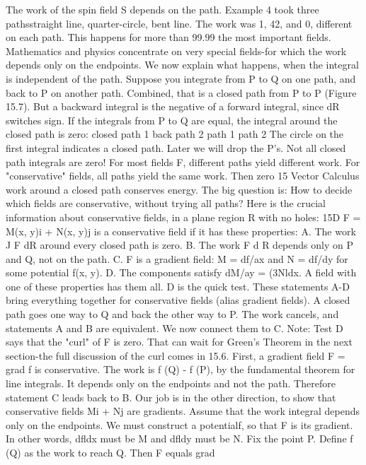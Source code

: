 The work of the spin field S depends on the path. Example 4 took three pathsstraight
line, quarter-circle, bent line. The work was 1, 42, and 0, different on each
path. This happens for more than 99.99%
the most important fields. Mathematics and physics concentrate on very special
fields-for which the work depends only on the endpoints. We now explain what
happens, when the integral is independent of the path.
Suppose you integrate from P to Q on one path, and back to P on another path.
Combined, that is a closed path from P to P (Figure 15.7). But a backward integral
is the negative of a forward integral, since dR switches sign. If the integrals from P
to Q are equal, the integral around the closed path is zero:
closed path 1 back path 2 path 1 path 2
The circle on the first integral indicates a closed path. Later we will drop the P's.
Not all closed path integrals are zero! For most fields F, different paths yield
different work. For "conservative" fields, all paths yield the same work. Then zero 
15 Vector Calculus
work around a closed path conserves energy. The big question is: How to decide
which fields are conservative, without trying all paths? Here is the crucial information
about conservative fields, in a plane region R with no holes:
15D F = M(x, y)i + N(x, y)j is a conservative field if it has these properties:
A. The work J F dR around every closed path is zero.
B. The work F d R depends only on P and Q, not on the path.
C. F is a gradient field: M = df/ax and N = df/dy for some potential f(x, y).
D. The components satisfy dM/ay = (3Nldx.
A field with one of these properties has them all. D is the quick test.
These statements A-D bring everything together for conservative fields (alias gradient
fields). A closed path goes one way to Q and back the other way to P. The work
cancels, and statements A and B are equivalent. We now connect them to C. Note:
Test D says that the "curl" of F is zero. That can wait for Green's Theorem in the
next section-the full discussion of the curl comes in 15.6.
First, a gradient field F = grad f is conservative. The work is f (Q) - f (P), by the
fundamental theorem for line integrals. It depends only on the endpoints and not the
path. Therefore statement C leads back to B.
Our job is in the other direction, to show that conservative fields Mi + Nj are
gradients. Assume that the work integral depends only on the endpoints. We must
construct a potentialf, so that F is its gradient. In other words, dfldx must be M and
dfldy must be N.
Fix the point P. Define f (Q) as the work to reach Q. Then F equals grad
